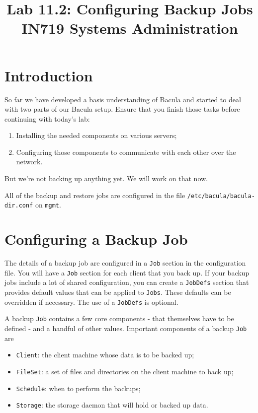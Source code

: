 \documentclass{article}   	%
\title{Lab 11.2:  Configuring Backup Jobs\\ IN719 Systems Administration}
\date{}							%
\begin{document}
\maketitle

\section*{Introduction}
So far we have developed a basis understanding of Bacula and started to deal with two parts of our Bacula setup. Ensure that you finish those tasks before continuing with today's lab:
\begin{enumerate}
	\item Installing the needed components on various servers;
	\item Configuring those components to communicate with each other over the network.
\end{enumerate}

But we're not backing up anything yet.  We will work on that now.

All of the backup and restore jobs are configured in the file \texttt{/etc/bacula/bacula-dir.conf} on \texttt{mgmt}.

\section{Configuring a Backup Job}
The details of a backup job are configured in a \texttt{Job} section in the configuration file.  You will have a \texttt{Job} section for each client that you back up.  If your backup jobs include a lot of shared configuration, you can create a \texttt{JobDefs} section that provides default values that can be applied to \texttt{Jobs}.  These defaults can be overridden if necessary.  The use of a \texttt{JobDefs} is optional.

A backup \texttt{Job} contains a few core components - that themselves have to be defined - and a handful of other values.  Important components of a backup \texttt{Job} are

\begin{itemize}
	\item \texttt{Client}: the client machine whose data is to be backed up;
	\item \texttt{FileSet}: a set of files and directories on the client machine to back up;
	\item \texttt{Schedule}: when to perform the backups;
	\item \texttt{Storage}: the storage daemon that will hold or backed up data.
\end{itemize}
\end{document}
